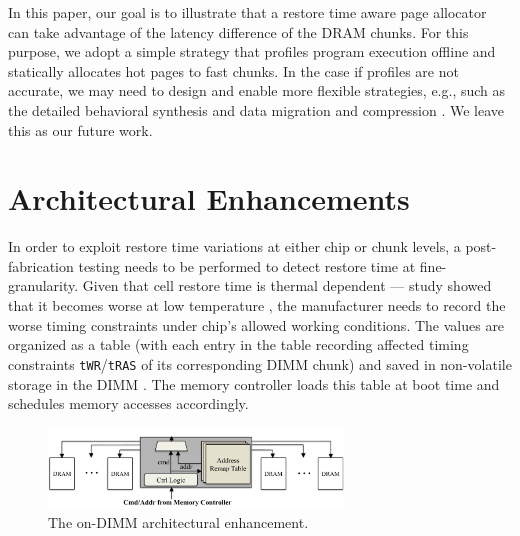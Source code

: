 In this paper, our goal is to illustrate that a restore time aware page allocator can take advantage of the latency difference of the DRAM chunks. For this purpose, we adopt a simple strategy that profiles program execution offline \cite{ISCA13:charm} and statically allocates hot pages to fast chunks. 
In the case if profiles are not accurate, we may need to design and enable more flexible strategies, e.g., such as the detailed behavioral synthesis \cite{TODAES11:partition} 
and data migration and compression \cite{TODAES08:bankmem}. We leave this as our future work. 

\section{Architectural Enhancements}

In order to exploit restore time variations at either chip or chunk levels, a post-fabrication testing needs to be performed to detect restore time at fine-granularity. Given that cell restore time is thermal dependent --- study showed that it becomes worse at low temperature \cite{MEM14:twr}, the manufacturer needs to record the worse timing constraints under chip's allowed working conditions. The values are organized as a table (with each entry in the table recording affected timing constraints {\tt tWR}/{\tt tRAS} of its corresponding DIMM chunk) and saved in non-volatile storage in the DIMM \cite{MICRO13:rowclone}. The memory controller loads this table at boot time and schedules memory accesses accordingly.%

\begin{figure}[ht] %
\begin{center}
\includegraphics[width=0.7\textwidth]{figures/TODAES_data/design.pdf}
\vspace{-0.2in}
\caption{The on-DIMM architectural enhancement.}
\label{fig:design}
\end{center}
\vspace{-0.45in}
\end{figure}

